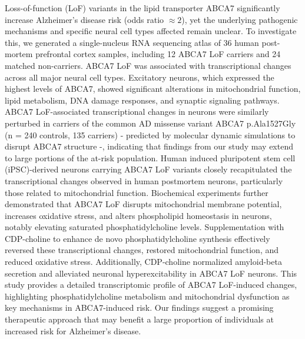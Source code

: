 Loss-of-function (LoF) variants in the lipid transporter ABCA7 significantly increase Alzheimer's disease risk (odds ratio $\approx  2$), yet the underlying pathogenic mechanisms and specific neural cell types affected remain unclear. To investigate this, we generated a single-nucleus RNA sequencing atlas of 36 human post-mortem prefrontal cortex samples, including 12 ABCA7 LoF carriers and 24 matched non-carriers. ABCA7 LoF was associated with transcriptional changes across all major neural cell types. Excitatory neurons, which expressed the highest levels of ABCA7, showed significant alterations in mitochondrial function, lipid metabolism, DNA damage responses, and synaptic signaling pathways. ABCA7 LoF-associated transcriptional changes in neurons were similarly perturbed in carriers of the common AD missense variant ABCA7 p.Ala1527Gly (n = 240 controls, 135 carriers) - predicted by molecular dynamic simulations to disrupt ABCA7 structure -, indicating that findings from our study may extend to large portions of the at-risk population. Human induced pluripotent stem cell (iPSC)-derived neurons carrying ABCA7 LoF variants closely recapitulated the transcriptional changes observed in human postmortem neurons, particularly those related to mitochondrial function. Biochemical experiments further demonstrated that ABCA7 LoF disrupts mitochondrial membrane potential, increases oxidative stress, and alters phospholipid homeostasis in neurons, notably elevating saturated phosphatidylcholine levels. Supplementation with CDP-choline to enhance de novo phosphatidylcholine synthesis effectively reversed these transcriptional changes, restored mitochondrial function, and reduced oxidative stress. Additionally, CDP-choline normalized amyloid-beta secretion and alleviated neuronal hyperexcitability in ABCA7 LoF neurons. This study provides a detailed transcriptomic profile of ABCA7 LoF-induced changes, highlighting phosphatidylcholine metabolism and mitochondrial dysfunction as key mechanisms in ABCA7-induced risk. Our findings suggest a promising therapeutic approach that may benefit a large proportion of individuals at increased risk for Alzheimer's disease.

